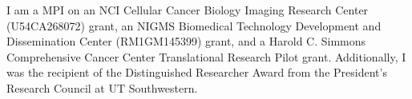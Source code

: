 
I am a MPI on an NCI Cellular Cancer Biology Imaging Research Center (U54CA268072) grant, an NIGMS Biomedical Technology Development and Dissemination Center (RM1GM145399) grant, and a Harold C. Simmons Comprehensive Cancer Center Translational Research Pilot grant. Additionally, I was the recipient of the Distinguished Researcher Award from the President’s Research Council at UT Southwestern.

